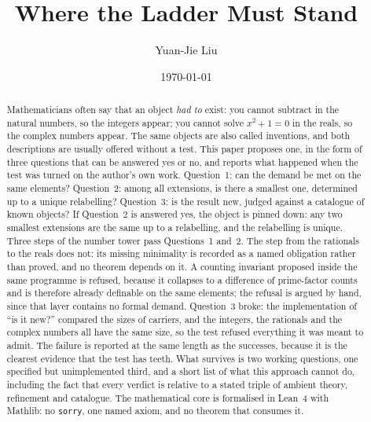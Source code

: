 \documentclass[aps,prd,preprint,superscriptaddress,amsmath,amssymb]{revtex4-2}
\begin{document}
\title{Where the Ladder Must Stand}

\author{Yuan-Jie Liu}

\date{\today}

\begin{abstract}
Mathematicians often say that an object \emph{had to} exist: you cannot subtract
in the natural numbers, so the integers appear; you cannot solve $x^2+1=0$ in the
reals, so the complex numbers appear.  The same objects are also called
inventions, and both descriptions are usually offered without a test.  This paper
proposes one, in the form of three questions that can be answered yes or no, and
reports what happened when the test was turned on the author's own work.
Question~1: can the demand be met on the same elements?  Question~2: among all
extensions, is there a smallest one, determined up to a unique relabelling?
Question~3: is the result new, judged against a catalogue of known objects?  If
Question~2 is answered yes, the object is pinned down: any two smallest
extensions are the same up to a relabelling, and the relabelling is unique.
Three steps of the number tower pass Questions~1 and~2.  The step from the
rationals to the reals does not: its missing minimality is recorded as a named
obligation rather than proved, and no theorem depends on it.  A counting
invariant proposed inside the same programme is refused, because it collapses to
a difference of prime-factor counts and is therefore already definable on the
same elements; the refusal is argued by hand, since that layer contains no
formal demand.  Question~3 broke: the implementation of ``is it new?'' compared
the sizes of carriers, and the integers, the rationals and the complex numbers
all have the same size, so the test refused everything it was meant to admit.
The failure is reported at the same length as the successes, because it is the
clearest evidence that the test has teeth.  What survives is two working
questions, one specified but unimplemented third, and a short list of what this
approach cannot do, including the fact that every verdict is relative to a
stated triple of ambient theory, refinement and catalogue.  The mathematical
core is formalised in Lean~4 with Mathlib: no \texttt{sorry}, one named axiom,
and no theorem that consumes it.
\end{abstract}

\maketitle
\end{document}

